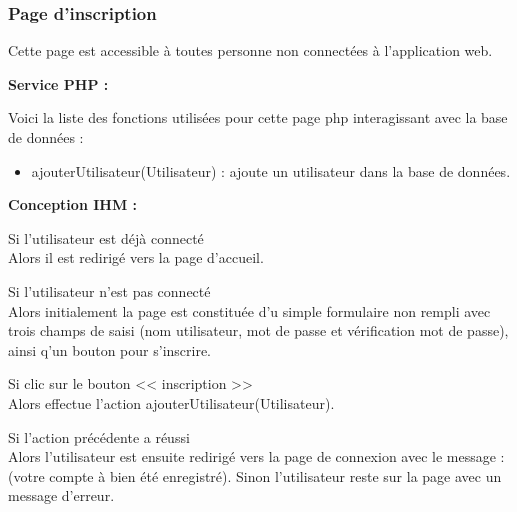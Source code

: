 		\subsubsection{Page d'inscription}

			\begin{paragraphe}
				Cette page est accessible à toutes personne non connectées à l'application web.
			\end{paragraphe}

			\begin{paragraphe}
				\textbf{Service PHP :}
			\end{paragraphe}

			\begin{paragraphe}
				Voici la liste des fonctions utilisées pour cette page php interagissant avec la base de données :
				\begin{itemize}
					\item ajouterUtilisateur(Utilisateur) : ajoute un utilisateur dans la base de données.
				\end{itemize}
			\end{paragraphe}

			\begin{paragraphe}
				\textbf{Conception IHM :}
			\end{paragraphe}

			\begin{paragraphe}
				Si l'utilisateur est déjà connecté \\
				Alors il est redirigé vers la page d'accueil.
			\end{paragraphe}

			\begin{paragraphe}
				Si l'utilisateur n'est pas connecté \\
				Alors initialement la page est constituée d'u simple formulaire non rempli avec trois champs de saisi (nom utilisateur, mot de passe et vérification mot de passe), ainsi q'un bouton pour s'inscrire.
			\end{paragraphe}


			\begin{paragraphe}
				Si clic sur le bouton << inscription >> \\
				Alors effectue l'action ajouterUtilisateur(Utilisateur).
			\end{paragraphe}

			\begin{paragraphe}
				Si l'action précédente a réussi \\
				Alors l'utilisateur est ensuite redirigé vers la page de connexion avec le message : (votre compte à bien été enregistré).
				Sinon l'utilisateur reste sur la page avec un message d'erreur.
			\end{paragraphe}


